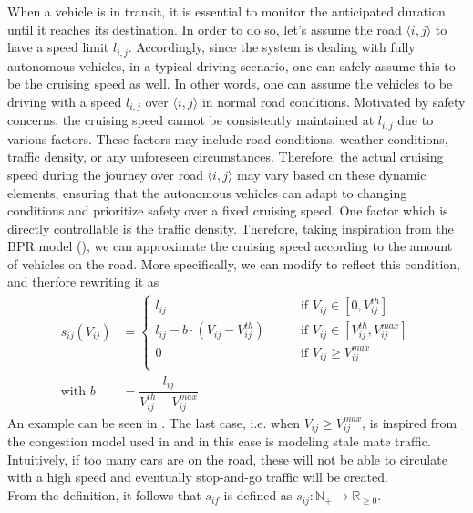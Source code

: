 When a vehicle is in transit, it is essential to monitor the anticipated duration until it reaches its destination. In order to do so, let's assume the road $\langle i,j\rangle$ to have a speed limit $l_{i,j}$. Accordingly, since the system is dealing with fully autonomous vehicles, in a typical driving scenario, one can safely assume this to be the cruising speed as well. In other words, one can assume the vehicles to be driving with a speed $l_{i,j}$ over $\langle i,j\rangle$ in normal road conditions.  Motivated by safety concerns, the cruising speed cannot be consistently maintained at \(l_{i,j}\) due to various factors. These factors may include road conditions, weather conditions, traffic density, or any unforeseen circumstances. Therefore, the actual cruising speed during the journey over road \(\langle i,j\rangle\) may vary based on these dynamic elements, ensuring that the autonomous vehicles can adapt to changing conditions and prioritize safety over a fixed cruising speed. One factor which is directly controllable is the traffic density. Therefore, taking inspiration from the BPR model (), we can approximate the cruising speed according to the amount of vehicles on the road. More specifically, we can modify  to reflect this condition, and therfore rewriting it as \\
\begin{equation}
	\begin{aligned}	
		s_{ij}(V_{ij}) &= \begin{cases}
			l_{ij} \quad\quad &\text{if } V_{ij}\in[0,V_{ij}^{th}]\\ 
			l_{ij} - b\cdot(V_{ij} - V_{ij}^{th}) \quad\quad &\text{if }V_{ij}\in[V_{ij}^{th}, V_{ij}^{max}]\\ 
			0\quad\quad &\text{if }V_{ij} \ge V_{ij}^{max}\\ 
		\end{cases}\\
		\text{with } b  &=  \dfrac{l_{ij}}{ V_{ij}^{th} -  V_{ij}^{max}}
\end{aligned}
	\label{eq:model_bpr_approximation2}
\end{equation}
An example can be seen in . The last case, i.e. when $V_{ij} \ge V_{ij}^{max}$, is inspired from the congestion model used in  and in this case is modeling stale mate traffic. Intuitively, if too many cars are on the road, these will not be able to circulate with a high speed and eventually stop-and-go traffic will be created. \\
From the definition, it follows that $s_{if}$ is defined as $s_{ij}: \mathbb{N}_{+} \rightarrow \mathbb{R}_{\ge 0}$.

